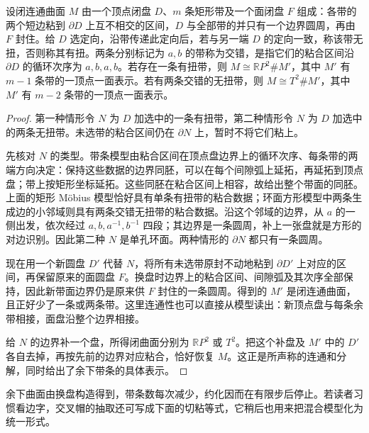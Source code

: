 \begin{lemma}\label{g1:lem:band-extraction}
	设闭连通曲面 \(M\) 由一个顶点闭盘 \(D\)、\(m\) 条矩形带及一个面闭盘 \(F\) 组成：各带的两个短边粘到 \(\partial D\) 上互不相交的区间，\(D\) 与全部带的并只有一个边界圆周，再由 \(F\) 封住。给 \(D\) 选定向，沿带传递此定向后，若与另一端 \(D\) 的定向一致，称该带无扭，否则称其有扭。两条分别标记为 \(a,b\) 的带称为交错，是指它们的粘合区间沿 \(\partial D\) 的循环次序为 \(a,b,a,b\)。若存在一条有扭带，则 \(M\cong\mathbb RP^2\#M'\)，其中 \(M'\) 有 \(m-1\) 条带的一顶点一面表示。若有两条交错的无扭带，则 \(M\cong T^2\#M'\)，其中 \(M'\) 有 \(m-2\) 条带的一顶点一面表示。
\end{lemma}
\begin{proof}
	第一种情形令 \(N\) 为 \(D\) 加选中的一条有扭带，第二种情形令 \(N\) 为 \(D\) 加选中的两条无扭带。未选带的粘合区间仍在 \(\partial N\) 上，暂时不将它们粘上。

	先核对 \(N\) 的类型。带条模型由粘合区间在顶点盘边界上的循环次序、每条带的两端方向决定：保持这些数据的边界同胚，可以在每个间隙弧上延拓，再延拓到顶点盘；带上按矩形坐标延拓。这些同胚在粘合区间上相容，故给出整个带面的同胚。上面的矩形 Möbius 模型恰好具有单条有扭带的粘合数据；环面方形模型中两条生成边的小邻域则具有两条交错无扭带的粘合数据。沿这个邻域的边界，从 \(a\) 的一侧出发，依次经过 \(a,b,a^{-1},b^{-1}\) 四段；其边界是一条圆周，补上一张盘就是方形的对边识别。因此第二种 \(N\) 是单孔环面。两种情形的 \(\partial N\) 都只有一条圆周。

	现在用一个新圆盘 \(D'\) 代替 \(N\)，将所有未选带原封不动地粘到 \(\partial D'\) 上对应的区间，再保留原来的面圆盘 \(F\)。换盘时边界上的粘合区间、间隙弧及其次序全部保持，因此新带面边界仍是原来供 \(F\) 封住的一条圆周。得到的 \(M'\) 是闭连通曲面，且正好少了一条或两条带。这里连通性也可以直接从模型读出：新顶点盘与每条余带相接，面盘沿整个边界相接。

	给 \(N\) 的边界补一个盘，所得闭曲面分别为 \(\mathbb RP^2\) 或 \(T^2\)。把这个补盘及 \(M'\) 中的 \(D'\) 各自去掉，再按先前的边界对应粘合，恰好恢复 \(M\)。这正是所声称的连通和分解，同时给出了余下带条的具体表示。
\end{proof}

余下曲面由换盘构造得到，带条数每次减少，约化因而在有限步后停止。若读者习惯看边字，交叉帽的抽取还可写成下面的切粘等式，它稍后也用来把混合模型化为统一形式。

